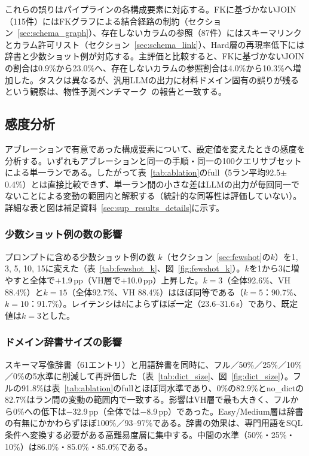 \documentclass[twocolumn]{interact}
\begin{document}
これらの誤りはパイプラインの各構成要素に対応する。FKに基づかないJOIN（115件）にはFKグラフによる結合経路の制約（セクション~\ref{sec:schema_graph}）、存在しないカラムの参照（87件）にはスキーマリンクとカラム許可リスト（セクション~\ref{sec:schema_link}）、Hard層の再現率低下には辞書と少数ショット例が対応する。主評価と比較すると、FKに基づかないJOINの割合は0.9\%から23.0\%へ、存在しないカラムの参照割合は4.0\%から10.3\%へ増加した。タスクは異なるが、汎用LLMの出力に材料ドメイン固有の誤りが残るという観察は、物性予測ベンチマーク~\cite{rubungo2025llmmatbench}の報告と一致する。

\subsection{感度分析}
\label{sec:sensitivity}

アブレーションで有意であった構成要素について、設定値を変えたときの感度を分析する。いずれもアブレーションと同一の手順・同一の100クエリサブセットによる単一ランである。したがって表~\ref{tab:ablation}のfull（5ラン平均92.5$\pm$0.4\%）とは直接比較できず、単一ラン間の小さな差はLLMの出力が毎回同一でないことによる変動の範囲内と解釈する（統計的な同等性は評価していない）。詳細な表と図は補足資料~\ref{sec:sup_results_details}に示す。

\subsubsection{少数ショット例の数の影響}
\label{sec:fewshot_sensitivity}

プロンプトに含める少数ショット例の数 $k$（セクション~\ref{sec:fewshot}の$k$）を1, 3, 5, 10, 15に変えた（表~\ref{tab:fewshot_k}、図~\ref{fig:fewshot_k}）。$k$を1から3に増やすと全体で$+$1.9\,pp（VH層で$+$10.0\,pp）上昇した。$k=3$（全体92.6\%、VH 88.4\%）と$k=15$（全体92.7\%、VH 88.4\%）はほぼ同等である（$k=5$：90.7\%、$k=10$：91.7\%）。レイテンシは$k$によらずほぼ一定（23.6--31.6\,s）であり、既定値は$k=3$とした。

\subsubsection{ドメイン辞書サイズの影響}
\label{sec:dict_sensitivity}

スキーマ写像辞書（61エントリ）と用語辞書を同時に、フル／50\%／25\%／10\%／0\%の5水準に削減して再評価した（表~\ref{tab:dict_size}、図~\ref{fig:dict_size}）。フルの91.8\%は表~\ref{tab:ablation}のfullとほぼ同水準であり、0\%の82.9\%とno\_dictの82.7\%はラン間の変動の範囲内で一致する。影響はVH層で最も大きく、フルから0\%への低下は$-$32.9\,pp（全体では$-$8.9\,pp）であった。Easy/Medium層は辞書の有無にかかわらずほぼ100\%／93--97\%である。辞書の効果は、専門用語をSQL条件へ変換する必要がある高難易度層に集中する。中間の水準（50\%・25\%・10\%）は86.0\%・85.0\%・85.0\%である。
\end{document}
